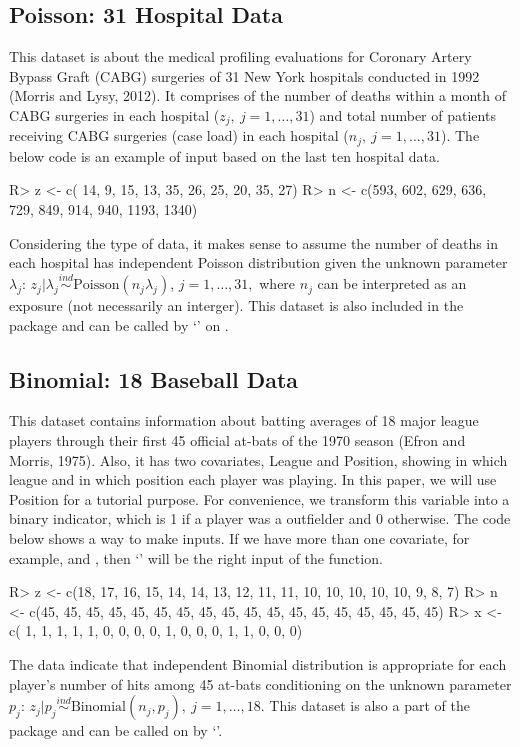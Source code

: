 \documentclass[article]{jss}
\begin{document}
\subsection{Poisson: 31 Hospital Data}
This dataset is about the medical profiling evaluations for Coronary Artery Bypass Graft (CABG) surgeries of 31 New York hospitals conducted in 1992 (Morris and Lysy, 2012). It comprises of the number of deaths within a month of CABG surgeries in each hospital ($z_{j},~j=1, \ldots, 31$) and total number of patients receiving CABG surgeries (case load) in each hospital ($n_{j},~j=1, \ldots, 31$). The below code is an example of input based on the last ten hospital data.
\begin{CodeChunk}
\begin{CodeInput}
R> z <- c( 14,   9,  15,  13,  35,  26,  25,  20,   35,   27)
R> n <- c(593, 602, 629, 636, 729, 849, 914, 940, 1193, 1340)
\end{CodeInput}
\end{CodeChunk}


Considering the type of data, it makes sense to assume the number of deaths in each hospital has independent Poisson distribution given the unknown parameter $\lambda_{j}$: $z_{j}\vert \lambda_{j}\stackrel{ind}{\sim} \textrm{Poisson}(n_{j}\lambda_{j})$, $j=1, \ldots, 31,$ where $n_{j}$ can be interpreted as an exposure (not necessarily an interger). This dataset is also included in the package and can be called by `' on .

\subsection{Binomial: 18 Baseball Data}
This dataset contains information about batting averages of 18 major league players through their first 45 official at-bats of the 1970 season (Efron and Morris, 1975). Also, it has two covariates, League and Position, showing in which league and in which position each player was playing. In this paper, we will use Position for a tutorial purpose. For convenience, we transform this variable into a binary indicator, which is 1 if a player was a outfielder and 0 otherwise. The code below shows a way to make inputs. If we have more than one covariate, for example,  and , then `' will be the right input of the  function.
\begin{CodeChunk}
\begin{CodeInput}
R> z <- c(18, 17, 16, 15, 14, 14, 13, 12, 11, 11, 10, 10, 10, 10, 10,  9,  8,  7)
R> n <- c(45, 45, 45, 45, 45, 45, 45, 45, 45, 45, 45, 45, 45, 45, 45, 45, 45, 45)
R> x <- c( 1,  1,  1,  1,  1,  0,  0,  0,  0,  1,  0,  0,  0,  1,  1,  0,  0,  0) 
\end{CodeInput}
\end{CodeChunk}
The data indicate that independent Binomial distribution is appropriate for each player's number of hits among 45 at-bats conditioning on the unknown parameter $p_{j}$: $z_{j}\vert p_{j}\stackrel{ind}{\sim} \textrm{Binomial}(n_{j}, p_{j}), ~j=1, \ldots, 18$. This dataset is also a part of the package and can be called on  by `'.
\end{document}
